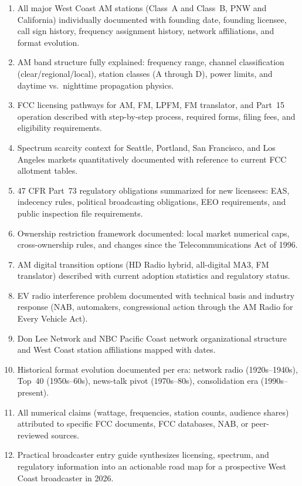 \documentclass[11pt,letterpaper]{article}
\begin{document}
\begin{asciibox}
\begin{enumerate}[leftmargin=*, label=\textbf{SC-\arabic{enumi}.}]
  \item All major West Coast AM stations (Class~A and Class~B, PNW and California) individually documented with founding date, founding licensee, call sign history, frequency assignment history, network affiliations, and format evolution.
  \item AM band structure fully explained: frequency range, channel classification (clear/regional/local), station classes (A through D), power limits, and daytime vs.\ nighttime propagation physics.
  \item FCC licensing pathways for AM, FM, LPFM, FM translator, and Part~15 operation described with step-by-step process, required forms, filing fees, and eligibility requirements.
  \item Spectrum scarcity context for Seattle, Portland, San Francisco, and Los Angeles markets quantitatively documented with reference to current FCC allotment tables.
  \item 47 CFR Part~73 regulatory obligations summarized for new licensees: EAS, indecency rules, political broadcasting obligations, EEO requirements, and public inspection file requirements.
  \item Ownership restriction framework documented: local market numerical caps, cross-ownership rules, and changes since the Telecommunications Act of 1996.
  \item AM digital transition options (HD Radio hybrid, all-digital MA3, FM translator) described with current adoption statistics and regulatory status.
  \item EV radio interference problem documented with technical basis and industry response (NAB, automakers, congressional action through the AM Radio for Every Vehicle Act).
  \item Don Lee Network and NBC Pacific Coast network organizational structure and West Coast station affiliations mapped with dates.
  \item Historical format evolution documented per era: network radio (1920s--1940s), Top~40 (1950s--60s), news-talk pivot (1970s--80s), consolidation era (1990s--present).
  \item All numerical claims (wattage, frequencies, station counts, audience shares) attributed to specific FCC documents, FCC databases, NAB, or peer-reviewed sources.
  \item Practical broadcaster entry guide synthesizes licensing, spectrum, and regulatory information into an actionable road map for a prospective West Coast broadcaster in 2026.
\end{enumerate}


\end{asciibox}
\end{document}
